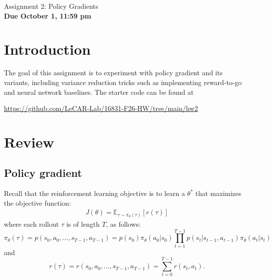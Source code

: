 \documentclass{article}
\begin{document}

\begin{centering}
    {\Large Assignment 2: Policy Gradients} \\
    \vspace{.25cm}
    \textbf{Due October 1, 11:59 pm} \\
\end{centering}

\section{Introduction}

The goal of this assignment is to experiment with policy gradient and its variants, including variance reduction tricks such as implementing reward-to-go and neural network baselines. The starter code can be found at

\begin{centering}
    \url{https://github.com/LeCAR-Lab/16831-F26-HW/tree/main/hw2} \\
\end{centering}

\vspace{.25cm}

\section{Review}


\subsection{Policy gradient}

Recall that the reinforcement learning objective is to learn a $\theta^*$ that maximizes the objective function:
\begin{align} \label{objective}
J(\theta) = \mathbb{E}_{\tau \sim \pi_\theta(\tau)} \left[r(\tau)\right]
\end{align}
where each rollout $\tau$ is of length $T$, as follows:
$$\pi_\theta(\tau) = p(s_0, a_0, ..., s_{T-1}, a_{T-1}) = p(s_0)\pi_\theta(a_0|s_0) \prod_{t=1}^{T-1} p(s_t | s_{t-1}, a_{t-1}) \pi_\theta(a_t | s_t)$$
and 
$$r(\tau) = r(s_0, a_0, ..., s_{T-1}, a_{T-1}) = \sum_{t=0}^{T-1} r(s_t, a_t).$$
\end{document}
